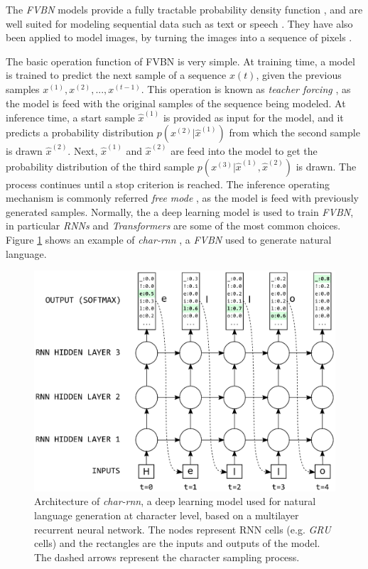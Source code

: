 The \textit{FVBN} models provide a fully tractable probability density function \cite{Goodfellow2016}, and are well suited for modeling sequential data such as text or speech \cite{Wang2017,Shen2018,Liu2019}. They have also been applied to model images, by turning the images into a sequence of pixels \cite{Oord2016, Oord2016b}.

The basic operation function of FVBN is very simple. At training time, a model is trained to predict the next sample of a sequence $x(t)$, given the previous samples $ x^{(1)}, x^{(2)}, ..., x^{(t-1)}$. This operation is known as \textit{teacher forcing} \cite{williams1989, goyal2016, Goodfellow2016}, as the model is feed with the original samples of the sequence being modeled. At inference time, a start sample $\hat{x}^{(1)}$ is provided as input for the model, and it predicts a probability distribution $p(x^{(2)}|\hat{x}^{(1)})$ from which the second sample is drawn $\hat{x}^{(2)}$. Next, $ \hat{x}^{(1)}$ and $\hat{x}^{(2)}$ are feed into the model to get the probability distribution of the third sample $p(x^{(3)}|\hat{x}^{(1)}, \hat{x}^{(2)})$ is drawn. The process continues until a stop criterion is reached. The inference operating mechanism is commonly referred \textit{free mode} \cite{Goodfellow2016}, as the model is feed with previously generated samples. Normally, the a deep learning model is used to train \textit{FVBN}, in particular \textit{RNNs} and \textit{Transformers} are some of the most common choices. Figure \ref{fig:charrnn} shows an example of \textit{char-rnn}  \cite{Sutskever2011, Graves2013}, a \textit{FVBN} used to generate natural language.

\begin{figure}
	\centering
	\includegraphics[width=0.8\linewidth]{chapter2/images/char_rnn}
	\caption{Architecture of \textit{char-rnn}, a deep learning model used for natural language generation at character level, based on a multilayer recurrent neural network. The nodes represent RNN cells (e.g. \textit{GRU} cells) and the rectangles are the inputs and outputs of the model. The dashed arrows represent the character sampling process.}
	\label{fig:charrnn}
\end{figure}


